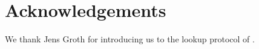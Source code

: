 \documentclass[11pt]{article} %
\newcommand{\F}{\ensuremath{\mathbb F}\xspace}
\newcommand{\prv}{\ensuremath{\mathsf{\mathbf{P}}}\xspace}
\newcommand{\set}[1]{\ensuremath{\left\{#1\right\}}\xspace}
\newcommand{\polysofdeg}[1]{\ensuremath{\F_{< #1}[X]}\xspace}
\begin{document}
\section*{Acknowledgements} 
We thank Jens Groth for introducing us to the lookup protocol of \cite{arya}.

% 
% 
% 


   
\end{document}
